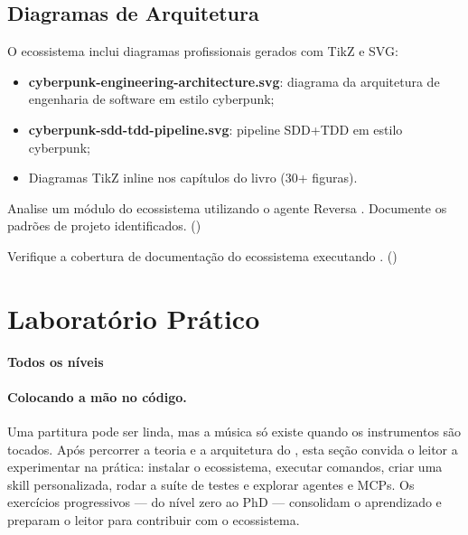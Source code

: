 \subsection{Diagramas de Arquitetura}
\label{subsec:diagramas}

O ecossistema inclui diagramas profissionais gerados com TikZ e SVG:

\begin{itemize}
\item \textbf{cyberpunk-engineering-architecture.svg}: diagrama da
arquitetura de engenharia de software em estilo cyberpunk;
\item \textbf{cyberpunk-sdd-tdd-pipeline.svg}: pipeline SDD+TDD em
estilo cyberpunk;
\item Diagramas TikZ inline nos capítulos do livro (30+ figuras).
\end{itemize}

\begin{exercicio}
Analise um módulo do ecossistema utilizando o agente Reversa
. Documente os padrões de projeto
identificados. (\nivelavancado)
\end{exercicio}

\begin{exercicio}
Verifique a cobertura de documentação do ecossistema executando
. (\nivelbasico)
\end{exercicio}

\section{Laboratório Prático}
\label{sec:laboratorio}
\textbf{Todos os níveis}

\paragraph{Colocando a mão no código.} Uma partitura pode ser linda, mas a música só existe quando os instrumentos são tocados. Após percorrer a teoria e a arquitetura do \opencodeeco{}, esta seção convida o leitor a experimentar na prática: instalar o ecossistema, executar comandos, criar uma skill personalizada, rodar a suíte de testes e explorar agentes e MCPs. Os exercícios progressivos — do nível zero ao PhD — consolidam o aprendizado e preparam o leitor para contribuir com o ecossistema.

